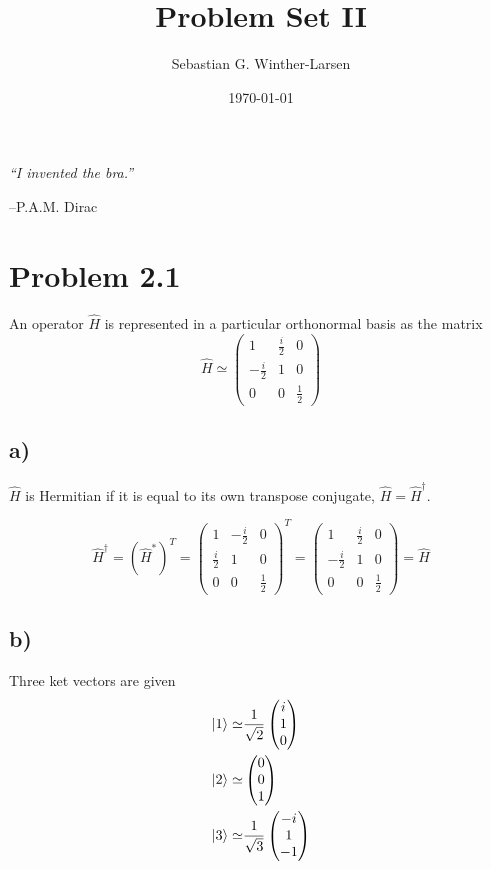 \documentclass{article}
\title{Problem Set II \\
  \hrulefill\fbox{\small{FYS3110}}\hrulefill}
\author{Sebastian G. Winther-Larsen}
\date{\today}
\newcommand*\colvec[3][]{
    \begin{pmatrix}\ifx\relax#1\relax\else#1\\\fi#2\\#3\end{pmatrix}
}
\begin{document}
\maketitle

\epigraph{\centering \large{\emph{``I invented the bra.''}}}{--P.A.M. Dirac}


\section*{Problem 2.1}

An operator $\hat{H}$ is represented in a particular orthonormal basis
as the matrix
\begin{equation}
\hat{H}\simeq
\begin{pmatrix}
1 & \frac{i}{2} & 0 \\
-\frac{i}{2} & 1 & 0 \\
0 & 0 & \frac{1}{2}
\end{pmatrix}
\end{equation}

\subsection*{a)}

$\hat{H}$ is Hermitian if it is equal to its own transpose conjugate,
$\hat{H}=\hat{H}^{\dagger}$.

\begin{equation}
\hat{H}^{\dagger}=(\hat{H}^*)^T=
\begin{pmatrix}
1 & -\frac{i}{2} & 0 \\
\frac{i}{2} & 1 & 0 \\
0 & 0 & \frac{1}{2}
\end{pmatrix}^T=
\begin{pmatrix}
1 & \frac{i}{2} & 0 \\
-\frac{i}{2} & 1 & 0 \\
0 & 0 & \frac{1}{2}
\end{pmatrix}=
\hat{H}
\end{equation}

\subsection*{b)}

Three ket vectors are given 
\begin{align}
\ket{1} \simeq& \frac{1}{\sqrt{2}}\colvec[i]{1}{0}  \label{ket1}\\
\ket{2} \simeq& \colvec[0]{0}{1} \label{ket2}\\
\ket{3} \simeq& \frac{1}{\sqrt{3}}\colvec[-i]{1}{-1} \label{ket3}
\end{align}
\end{document}
